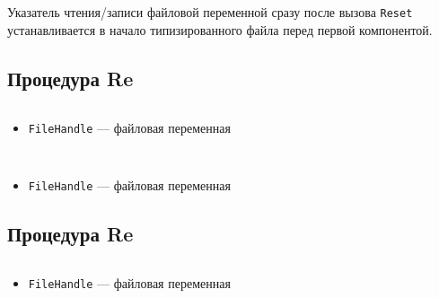\documentclass[10pt,a4paper]{report}
\begin{document}
Указатель чтения/записи файловой переменной сразу после вызова \texttt{Reset} устанавливается в начало типизированного файла перед первой компонентой.


\subsection*{Процедура Re}
\texttt{}
\begin{verbatim}

\end{verbatim}
\begin{itemize}
\item \texttt{FileHandle} --- файловая переменная
\end{itemize}


\subsection*{}
\texttt{}
\begin{verbatim}

\end{verbatim}
\begin{itemize}
\item \texttt{FileHandle} --- файловая переменная
\end{itemize}


\subsection*{Процедура Re}
\texttt{}
\begin{verbatim}

\end{verbatim}
\begin{itemize}
\item \texttt{FileHandle} --- файловая переменная
\end{itemize}
\end{document}
